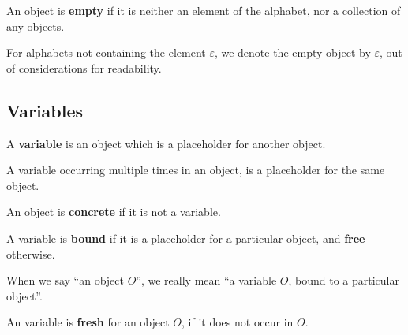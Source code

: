 \begin{definition}

An object is \textbf{empty} if it is neither an element of the alphabet, nor a
collection of any objects.

\end{definition}

\begin{notation}

For alphabets not containing the element $\varepsilon$, we denote the empty
object by $\varepsilon$, out of considerations for readability.

\end{notation}

\subsection{Variables}

\begin{definition}

A \textbf{variable} is an object which is a placeholder for another object.

\end{definition}

\begin{definition}

A variable occurring multiple times in an object, is a placeholder for the same
object.

\end{definition}

\begin{definition}

An object is \textbf{concrete} if it is not a variable.

\end{definition}

\begin{definition}

A variable is \textbf{bound} if it is a placeholder for a particular object,
and \textbf{free} otherwise.

\end{definition}

\begin{notation}

When we say ``an object $O$'', we really mean ``a variable $O$, bound to a
particular object''.

\end{notation}

\begin{definition}

An variable is \textbf{fresh} for an object $O$, if it does not occur in $O$.

\end{definition}

